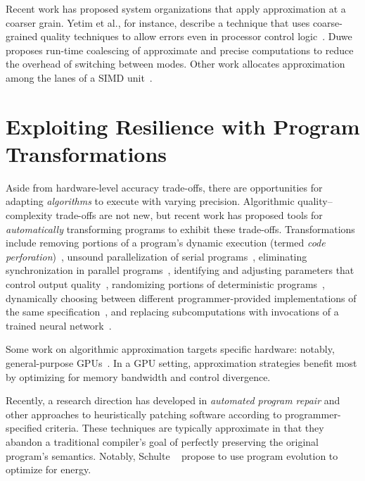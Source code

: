 Recent work has proposed system organizations that apply approximation at a
coarser grain.
Yetim et al., for instance,
describe a technique that uses coarse-grained quality techniques to
allow errors even in processor control logic~\cite{martonosi-date, commguard}.
Duwe~\cite{duwe-thesis} proposes run-time coalescing of approximate and
precise computations to reduce the overhead of switching between modes.
Other work allocates approximation among the lanes of a SIMD
unit~\cite{tabsh}.



\section{Exploiting Resilience with Program Transformations}
\label{sec:related:software}

Aside from hardware-level accuracy trade-offs, there are opportunities for
adapting \emph{algorithms} to execute with varying precision. Algorithmic
quality--complexity trade-offs are not new, but recent work has
proposed
tools for \emph{automatically} transforming programs to exhibit these
trade-offs.
Transformations include removing portions of a program's dynamic execution
(termed \emph{code perforation})~\cite{perforation}, unsound
parallelization of serial programs~\cite{quickstep}, eliminating
synchronization in parallel programs~\cite{dubstep, races-ibm, hogwild,
forgiving-parallel},
identifying and adjusting parameters that control output
quality~\cite{dynamicknobs}, randomizing portions of deterministic
programs~\cite{zhu-popl12, sasa-sas11}, dynamically choosing between
different programmer-provided implementations of the same
specification~\cite{green, virus, petabricks, taco-soc, ansel-autotuning,
scalable-classifier}, and replacing subcomputations with invocations
of a trained neural network~\cite{npu}.

Some work on algorithmic approximation targets specific hardware: notably,
general-purpose GPUs~\cite{paraprox, sage, herding, neuralgpu}.
In a GPU setting, approximation strategies benefit most by optimizing for
memory bandwidth and control divergence.

Recently, a research direction has developed in \emph{automated program
repair} and other approaches to heuristically patching software according to
programmer-specified criteria.
These techniques are typically approximate in that they abandon a traditional
compiler's goal of perfectly preserving the original program's semantics.
Notably, Schulte \etal~\cite{schulte} propose to use program evolution to
optimize for energy.

